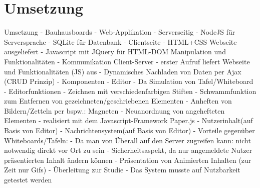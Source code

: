 \documentclass[11pt]{beamer}
\begin{document}
\section{Umsetzung}
\begin{frame}{Umsetzung}
  - Bauhausboards
  - Web-Applikation
    - Serverseitig
      - NodeJS für Serversprache
      - SQLite für Datenbank
    - Clientseite
      - HTML+CSS Webseite ausgeliefert
      - Javascript mit JQuery für HTML-DOM Manipulation und Funktionalitäten
    - Kommunikation Client-Server
      - erster Aufruf liefert Webseite und Funktionalitäten (JS) aus
      - Dynamisches Nachladen von Daten per Ajax (CRUD Prinzip)
    - Komponenten
      - Editor - Da Simulation von Tafel/Whiteboard
        - Editorfunktionen
          - Zeichnen mit verschiedenfarbigen Stiften
          - Schwammfunktion zum Entfernen von gezeichneten/geschriebenen Elementen
          - Anheften von Bildern/Zetteln per bspw.: Magneten
          - Neuanordnung von angehefteten Elementen
        - realisiert mit dem Javascript-Framework Paper.js
      - Nutzerinhalt(auf Basis von Editor)
      - Nachrichtensystem(auf Basis von Editor)
    - Vorteile gegenüber Whiteboards/Tafeln:
      - Da man von Überall auf den Server zugreifen kann: nicht notwendig direkt vor Ort zu sein
      - Sicherheitsaspekt, da nur angemeldete Nutzer präsentierten Inhalt ändern können
      - Präsentation von Animierten Inhalten (zur Zeit nur Gifs)
  - Überleitung zur Studie
    - Das System musste auf Nutzbarkeit getestet werden
\end{frame}
\end{document}

